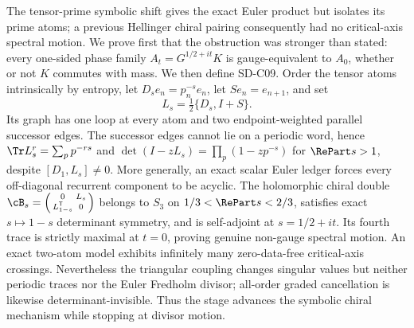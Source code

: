 The tensor-prime symbolic shift gives the exact Euler product but isolates
its prime atoms; a previous Hellinger chiral pairing consequently had no
critical-axis spectral motion.  We prove first that the obstruction was
stronger than stated: every one-sided phase family
$A_t=G^{1/2+it}K$ is gauge-equivalent to $A_0$, whether or not $K$ commutes
with mass.  We then define SD-C09.  Order the tensor atoms intrinsically by
entropy, let $D_se_n=p_n^{-s}e_n$, let $Se_n=e_{n+1}$, and set
\[
 L_s=\tfrac12\{D_s,I+S\}.
\]
Its graph has one loop at every atom and two endpoint-weighted parallel
successor edges.  The successor edges cannot lie on a periodic word, hence
$\Tr L_s^r=\sum_pp^{-rs}$ and
$\det(I-zL_s)=\prod_p(1-zp^{-s})$ for $\RePart s>1$, despite
$[D_1,L_s]\ne0$.  More generally, an exact scalar Euler ledger forces every
off-diagonal recurrent component to be acyclic.  The holomorphic chiral
double $\cB_s=\left(\begin{smallmatrix}0&L_s\\L_{1-s}^{\mathsf T}&0\end{smallmatrix}\right)$
belongs to $S_3$ on $1/3<\RePart s<2/3$, satisfies exact $s\mapsto1-s$
determinant symmetry, and is self-adjoint at $s=1/2+it$.  Its fourth trace is
strictly maximal at $t=0$, proving genuine non-gauge spectral motion.  An
exact two-atom model exhibits infinitely many zero-data-free critical-axis
crossings.  Nevertheless the triangular coupling changes singular values
but neither periodic traces nor the Euler Fredholm divisor; all-order graded
cancellation is likewise determinant-invisible.  Thus the stage advances
the symbolic chiral mechanism while stopping at divisor motion.
